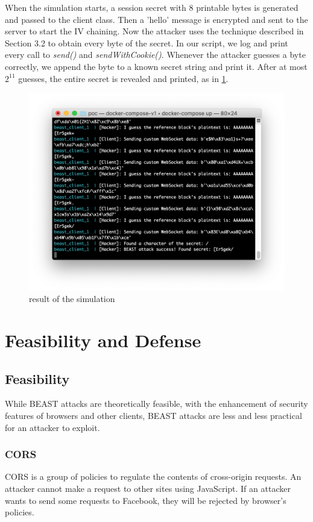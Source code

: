 \documentclass{acm_proc_article-sp}
\begin{document}
When the simulation starts, a session secret with 8 printable bytes is generated and passed to the
client class.
Then a 'hello' message is encrypted and sent to the server to start the IV chaining.
Now the attacker uses the technique described in Section 3.2 to obtain every byte of the secret.
In our script, we log and print every call to \textit{send()} and \textit{sendWithCookie()}.
Whenever the attacker guesses a byte correctly, we append the byte to a known secret string and
print it. After at most $2^{11}$ guesses, the entire secret is revealed and printed, as in \ref{fig:simulation}.
\begin{figure}[htb]
    \centering
    \includegraphics[keepaspectratio, width=\linewidth]{./figures/simulation.png}
    \caption{result of the simulation}
    \label{fig:simulation}
\end{figure}

\section{Feasibility and Defense}
\subsection{Feasibility}
While BEAST attacks are theoretically feasible, with the enhancement of security
features of browsers and other clients, BEAST attacks are less and less practical
for an attacker to exploit.

\subsubsection{CORS}
CORS is a group of policies to regulate the contents of cross-origin requests.
An attacker cannot make a request to other sites using JavaScript. If an attacker
wants to send some requests to Facebook, they will be rejected by browser's policies.
\end{document}

